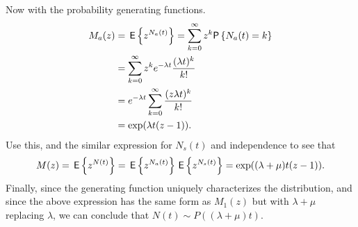 \begin{exercise}
\begin{solution}
Now   with the probability generating functions.
      \begin{equation*}
        \begin{split}
          M_a(z) 
&= \E{z^{N_a(t)}} = \sum_{k=0}^\infty z^k \P{N_a(t) = k} \\
&= \sum_{k=0}^\infty z^k e^{-\lambda t} \frac{(\lambda t)^k}{k!} \\
&= e^{-\lambda t} \sum_{k=0}^\infty  \frac{(z \lambda t)^k}{k!} \\
&=\exp(\lambda t (z-1)). 
        \end{split}
      \end{equation*}
      Use this, and the similar expression for $N_s(t)$ and
      independence to see that
\begin{equation*}
M(z) = \,\mathsf{E}\left\{z^{N(t)}\right\} = \,\mathsf{E}\left\{z^{N_a(t)}\right\} \,\mathsf{E}\left\{z^{N_s(t)}\right\} = \exp((\lambda +\mu)t (z-1)). 
\end{equation*}
Finally, since the  generating function uniquely characterizes
the distribution, and since the above expression has the same form as
$M_1(z)$ but with $\lambda+\mu$ replacing $\lambda$, we can conclude that $N(t)\sim P((\lambda +\mu) t)$.
    \end{solution}
\end{exercise}


